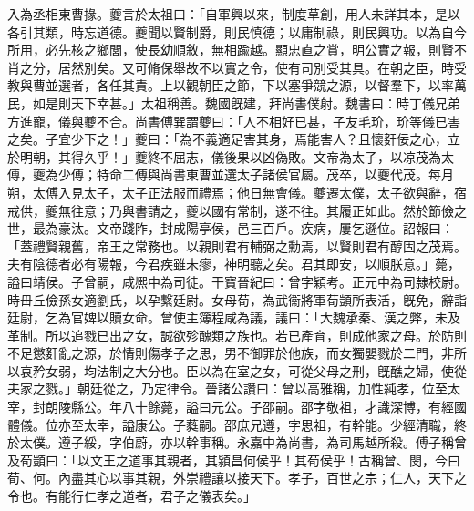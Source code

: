 \begin{pinyinscope}
入為丞相東曹掾。夔言於太祖曰：「自軍興以來，制度草創，用人未詳其本，是以各引其類，時忘道德。夔聞以賢制爵，則民慎德；以庸制祿，則民興功。以為自今所用，必先核之鄉閭，使長幼順敘，無相踰越。顯忠直之賞，明公實之報，則賢不肖之分，居然別矣。又可脩保舉故不以實之令，使有司別受其具。在朝之臣，時受教與曹並選者，各任其責。上以觀朝臣之節，下以塞爭競之源，以督羣下，以率萬民，如是則天下幸甚。」太祖稱善。魏國旣建，拜尚書僕射。魏書曰：時丁儀兄弟方進寵，儀與夔不合。尚書傅巽謂夔曰：「人不相好已甚，子友毛玠，玠等儀已害之矣。子宜少下之！」夔曰：「為不義適足害其身，焉能害人？且懷姧佞之心，立於明朝，其得久乎！」夔終不屈志，儀後果以凶偽敗。文帝為太子，以凉茂為太傅，夔為少傅；特命二傅與尚書東曹並選太子諸侯官屬。茂卒，以夔代茂。每月朔，太傅入見太子，太子正法服而禮焉；他日無會儀。夔遷太僕，太子欲與辭，宿戒供，夔無往意；乃與書請之，夔以國有常制，遂不往。其履正如此。然於節儉之世，最為豪汰。文帝踐阼，封成陽亭侯，邑三百戶。疾病，屢乞遜位。詔報曰：「蓋禮賢親舊，帝王之常務也。以親則君有輔弼之勳焉，以賢則君有醇固之茂焉。夫有陰德者必有陽報，今君疾雖未瘳，神明聽之矣。君其即安，以順朕意。」薨，謚曰靖侯。子曾嗣，咸熈中為司徒。干寶晉紀曰：曾字穎考。正元中為司隷校尉。時毌丘儉孫女適劉氏，以孕繫廷尉。女母荀，為武衞將軍荀顗所表活，旣免，辭詣廷尉，乞為官婢以贖女命。曾使主簿程咸為議，議曰：「大魏承秦、漢之弊，未及革制。所以追戮已出之女，誠欲殄醜類之族也。若已產育，則成他家之母。於防則不足懲姧亂之源，於情則傷孝子之思，男不御罪於他族，而女獨嬰戮於二門，非所以哀矜女弱，均法制之大分也。臣以為在室之女，可從父母之刑，旣醮之婦，使從夫家之戮。」朝廷從之，乃定律令。晉諸公讚曰：曾以高雅稱，加性純孝，位至太宰，封朗陵縣公。年八十餘薨，謚曰元公。子邵嗣。邵字敬祖，才識深博，有經國體儀。位亦至太宰，謚康公。子蕤嗣。邵庶兄遵，字思祖，有幹能。少經清職，終於太僕。遵子綏，字伯蔚，亦以幹事稱。永嘉中為尚書，為司馬越所殺。傅子稱曾及荀顗曰：「以文王之道事其親者，其潁昌何侯乎！其荀侯乎！古稱曾、閔，今曰荀、何。內盡其心以事其親，外崇禮讓以接天下。孝子，百世之宗；仁人，天下之令也。有能行仁孝之道者，君子之儀表矣。」


\end{pinyinscope}